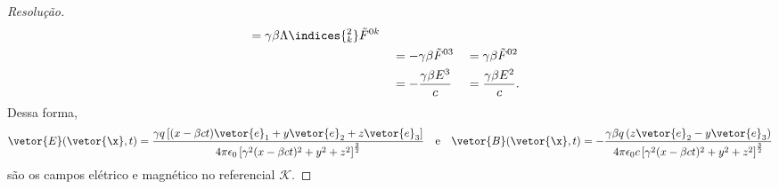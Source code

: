 \begin{proof}[Resolução]
\begin{align*}
          &= \gamma\beta \Lambda\indices{^2_k} \tilde{F}^{0k}\\
          &&
          &= -\gamma\beta \tilde{F}^{03}&
          &= \gamma\beta \tilde{F}^{02}\\
          &&
          &= -\frac{\gamma \beta E^3}{c}&
          &= \frac{\gamma \beta E^2}{c}.
   \end{align*}
   Dessa forma, 
   \begin{equation*}
      \vetor{E}(\vetor{\x}, t) = \frac{\gamma q \left[(x - \beta ct)\vetor{e}_1 + y\vetor{e}_2 + z\vetor{e}_3\right]}{4\pi \epsilon_0 \left[\gamma^2 (x - \beta ct)^2 + y^2 + z^2\right]^{\frac32}}
      \quad\text{e}\quad
      \vetor{B}(\vetor{\x}, t) = -\frac{\gamma \beta q \left(z\vetor{e}_2 - y\vetor{e}_3\right)}{4\pi \epsilon_0 c\left[\gamma^2 (x - \beta ct)^2 + y^2 + z^2\right]^{\frac32}}
   \end{equation*}
   são os campos elétrico e magnético no referencial \(\mathscr{K}.\)
\end{proof}
